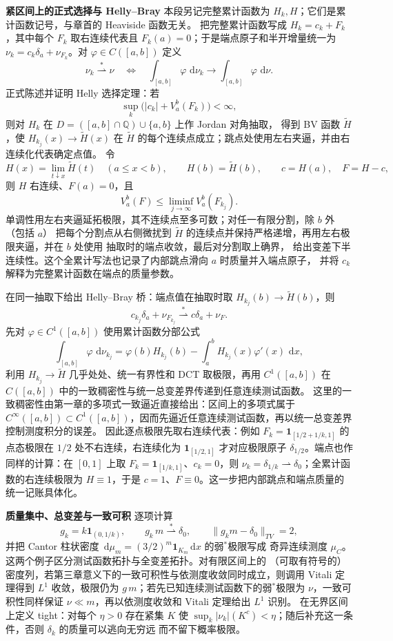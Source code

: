 \documentclass[11pt,a4paper]{ctexart}
\newcommand{\dd}{\,\mathrm d}
\newcommand{\weakto}{\rightharpoonup}
\newcommand{\planitem}[1]{\par\smallskip\noindent\textcolor{deepblue}{\textbf{#1}}\quad}
\begin{document}
\planitem{紧区间上的正式选择与 Helly--Bray}
本段另记完整累计函数为 $H_k,H$；它们是累计函数记号，与章首的 Heaviside 函数无关。
把完整累计函数写成 $H_k=c_k+F_k$，其中每个 $F_k$ 取右连续代表且
$F_k(a)=0$；于是端点原子和半开增量统一为
$\nu_k=c_k\delta_a+\nu_{F_k}$。对 $\varphi\in C([a,b])$ 定义
\[
 \nu_k\stackrel{*}{\rightharpoonup}\nu
 \quad\Longleftrightarrow\quad
 \int_{[a,b]}\varphi\,\dd\nu_k\longrightarrow
 \int_{[a,b]}\varphi\,\dd\nu .
\]
正式陈述并证明 Helly 选择定理：若
\[
 \sup_k\bigl(|c_k|+V_a^b(F_k)\bigr)<\infty,
\]
则对 $H_k$ 在 $D=([a,b]\cap\mathbb Q)\cup\{a,b\}$ 上作 Jordan 对角抽取，
得到 BV 函数 $\widetilde H$，使 $H_{k_j}(x)\to\widetilde H(x)$ 在
$\widetilde H$ 的每个连续点成立；跳点处使用左右夹逼，并由右连续化代表确定点值。
令
\[
 H(x)=\lim_{t\downarrow x}\widetilde H(t)\quad(a\le x<b),\qquad H(b)=\widetilde H(b),
 \qquad c=H(a),\quad F=H-c,
\]
则 $H$ 右连续、$F(a)=0$，且
\[
 V_a^b(F)\le\liminf_{j\to\infty}V_a^b(F_{k_j}).
\]
单调性用左右夹逼延拓极限，其不连续点至多可数；对任一有限分割，除 $b$ 外（包括 $a$）
把每个分割点从右侧微扰到 $\widetilde H$ 的连续点并保持严格递增，再用左右极限夹逼，并在 $b$ 处使用
抽取时的端点收敛，最后对分割取上确界，
给出变差下半连续性。这个全累计写法也记录了内部跳点滑向 $a$ 时质量并入端点原子，
并将 $c_k$ 解释为完整累计函数在端点的质量参数。

在同一抽取下给出 Helly--Bray 桥：端点值在抽取时取
$H_{k_j}(b)\to\widetilde H(b)$，则
\[
 c_{k_j}\delta_a+\nu_{F_{k_j}}
 \stackrel{*}{\rightharpoonup}c\delta_a+\nu_F .
 \]
先对 $\varphi\in C^1([a,b])$ 使用累计函数分部公式
 \[
 \int_{[a,b]}\varphi\,\dd\nu_{k_j}
 =\varphi(b)H_{k_j}(b)-\int_a^bH_{k_j}(x)\varphi'(x)\,\dd x,
\]
利用 $H_{k_j}\to\widetilde H$ 几乎处处、统一有界性和 DCT 取极限，再用
$C^1([a,b])$ 在 $C([a,b])$ 中的一致稠密性与统一总变差界传递到任意连续测试函数。
这里的一致稠密性由第一章的多项式一致逼近直接给出：区间上的多项式属于
$C^\infty([a,b])\subset C^1([a,b])$，因而先逼近任意连续测试函数，再以统一总变差界控制测度积分的误差。
因此逐点极限先取右连续代表：例如
$F_k=\mathbf1_{[1/2+1/k,1]}$ 的点态极限在 $1/2$ 处不右连续，右连续化为
$\mathbf1_{[1/2,1]}$ 才对应极限原子 $\delta_{1/2}$。端点也作同样的计算：在
$[0,1]$ 上取 $F_k=\mathbf1_{[1/k,1]}$、$c_k=0$，则
$\nu_k=\delta_{1/k}\weakto\delta_0$；全累计函数的右连续极限为 $H\equiv1$，于是
$c=1$、$F\equiv0$。这一步把内部跳点和端点质量的统一记账具体化。

\planitem{质量集中、总变差与一致可积}
逐项计算
\[
 g_k=k\mathbf1_{(0,1/k)},\qquad g_k\,m\stackrel{*}{\rightharpoonup}\delta_0,
 \qquad\|g_km-\delta_0\|_{TV}=2,
\]
并把 Cantor 柱状密度 $\dd\mu_m=(3/2)^m\mathbf1_{K_m}\dd x$ 的弱$^*$极限写成
奇异连续测度 $\mu_C$。这两个例子区分测试函数拓扑与全变差拓扑。对有限区间上的
（可取有符号的）密度列，若第三章意义下的一致可积性与依测度收敛同时成立，则调用
Vitali 定理得到 $L^1$ 收敛，极限仍为 $g\,m$；若先已知连续测试函数下的弱$^*$极限为
$\nu$，一致可积性同样保证 $\nu\ll m$，再以依测度收敛和 Vitali 定理给出 $L^1$ 识别。
在无界区间上定义 tight：对每个 $\eta>0$ 存在紧集 $K$ 使
$\sup_k|\nu_k|(K^c)<\eta$；随后补充这一条件，否则 $\delta_k$ 的质量可以逃向无穷远
而不留下概率极限。
\end{document}
